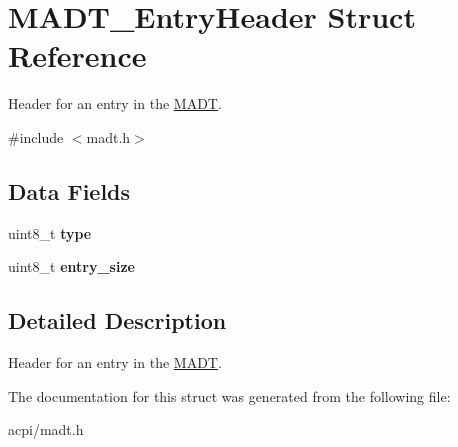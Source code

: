 \hypertarget{structMADT__EntryHeader}{}\section{M\+A\+D\+T\+\_\+\+Entry\+Header Struct Reference}
\label{structMADT__EntryHeader}


Header for an entry in the \hyperlink{structMADT}{M\+A\+DT}.  




{\ttfamily \#include $<$madt.\+h$>$}

\subsection*{Data Fields}
\begin{DoxyCompactItemize}
\item 
uint8\+\_\+t {\bfseries type}\hypertarget{structMADT__EntryHeader_a1d262ccba334efc4e1c6529e955f1b64}{}\label{structMADT__EntryHeader_a1d262ccba334efc4e1c6529e955f1b64}

\item 
uint8\+\_\+t {\bfseries entry\+\_\+size}\hypertarget{structMADT__EntryHeader_a4b6c661eba08aac69b076a48da673608}{}\label{structMADT__EntryHeader_a4b6c661eba08aac69b076a48da673608}

\end{DoxyCompactItemize}


\subsection{Detailed Description}
Header for an entry in the \hyperlink{structMADT}{M\+A\+DT}. 

The documentation for this struct was generated from the following file\+:\begin{DoxyCompactItemize}
\item 
acpi/madt.\+h\end{DoxyCompactItemize}
